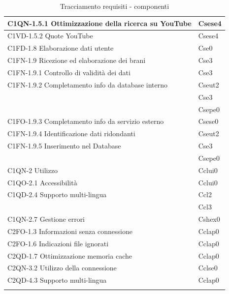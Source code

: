\begin{footnotesize}
\begin{longtable}[!h]{|l|l|}
C1QN-1.5.1 Ottimizzazione della ricerca su YouTube & Csese4 \\ \hline
C1VD-1.5.2 Quote YouTube & Csese4\\ \hline
C1FD-1.8 Elaborazione dati utente & Cse0\\ \hline
C1FN-1.9 Ricezione ed elaborazione dei brani & Cse3\\ \hline
C1FN-1.9.1 Controllo di validit\`a dei dati & Cse3\\ \hline
C1FN-1.9.2 Completamento info da database interno & Cseut2\\
 & Cse3\\
 & Csepe0\\\hline
C1FO-1.9.3 Completamento info da servizio esterno & Csese0\\ \hline
C1FN-1.9.4 Identificazione dati ridondanti & Cseut2\\ \hline
C1FN-1.9.5 Inserimento nel Database & Cse3\\
 & Csepe0\\\hline
C1QN-2 Utilizzo & Cclui0\\ \hline
C1QO-2.1 Accessibilit\`a &Cclui0\\ \hline
C1QD-2.4 Supporto multi-lingua & Ccl2\\
 & Ccl3\\\hline
C1QN-2.7 Gestione errori & Cshex0\\ \hline
C2FO-1.3 Informazioni senza connessione & Cclap0\\ \hline
C2FO-1.6 Indicazioni file ignorati & Cclap0\\ \hline
C2QD-1.7 Ottimizzazione memoria cache & Cclap0\\ \hline 
C2QN-3.2 Utilizzo della connessione & Cclse0\\ \hline 
C2QD-4.3 Supporto multi-lingua & Cclap0\\ \hline
\caption{Tracciamento requisiti - componenti}
\end{longtable}
\end{footnotesize}

